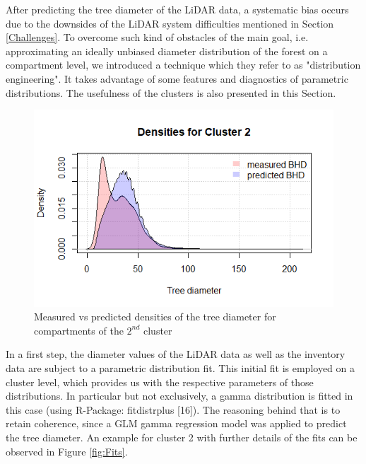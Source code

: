 
After predicting the tree diameter of the LiDAR data, a systematic bias occurs due to the downsides of the LiDAR system difficulties mentioned in Section \ref{Challenges}. To overcome such kind of obstacles of the main goal, i.e. approximating an ideally unbiased diameter distribution of the forest on a compartment level, we introduced a technique which they refer to as "distribution engineering". It takes advantage of some features and diagnostics of parametric distributions. The usefulness of the clusters is also presented in this Section.\\

\begin{figure}[H]
\centering
  \includegraphics[scale = 0.8]{dens2.png}
  \caption{Measured vs predicted densities of the tree diameter for compartments of the $2^{nd}$ cluster}
  \label{fig:example_dens2}
\end{figure}


In a first step, the diameter values of the LiDAR data as well as the inventory data are subject to a parametric distribution fit. This initial fit is employed on a cluster level, which provides us with the respective parameters of those distributions. In particular but not exclusively, a gamma distribution is fitted in this case (using R-Package: fitdistrplus [16]). The reasoning behind that is to retain coherence, since a GLM gamma regression model was applied to predict the tree diameter. An example for cluster 2 with further details of the fits can be observed in Figure \ref{fig:Fits}.

